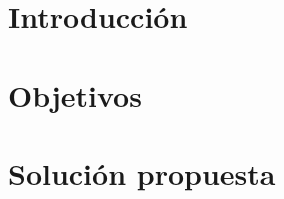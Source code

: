 \documentclass[12pt, twoside, openright]{report}
\begin{document}

\tableofcontents
\listoffigures
\listoftables

\chapter{Introducción}


\chapter{Objetivos}


\chapter{Solución propuesta}


\printbibliography
\end{document}
